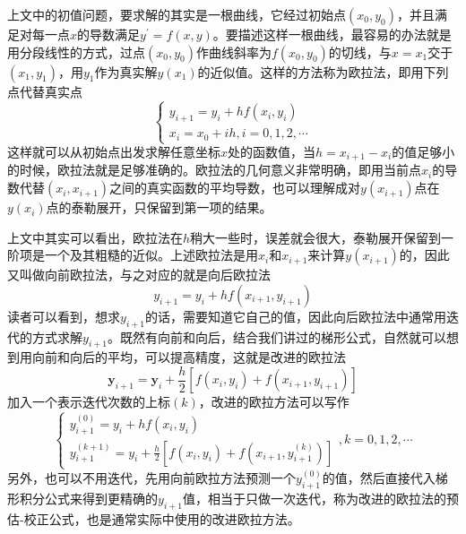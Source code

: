 \documentclass[12pt,a4paper,openany,twoside]{book}
\numberwithin{equation}{section}
\begin{document}
      上文中的初值问题，要求解的其实是一根曲线，它经过初始点$(x_0,y_0)$，并且满足对每一点$x$的导数满足$y^{\prime}=f(x, y)$。要描述这样一根曲线，最容易的办法就是用分段线性的方式，过点$(x_0,y_0)$作曲线斜率为$f(x_0,y_0)$的切线，与$x=x_1$交于$(x_1,y_1)$，用$y_1$作为真实解$y(x_1)$的近似值。这样的方法称为欧拉法，即用下列点代替真实点
      \begin{equation}
        \left\{\begin{array}{l}{y_{i+1}=y_{i}+h f\left(x_{i}, y_{i}\right)} \\ {x_{i}=x_{0}+i h, i=0,1,2, \cdots}\end{array}\right.
      \end{equation}
      这样就可以从初始点出发求解任意坐标$x$处的函数值，当$h = x_{i+1}-x_i$的值足够小的时候，欧拉法就是足够准确的。欧拉法的几何意义非常明确，即用当前点$x_i$的导数代替$(x_i,x_{i+1})$之间的真实函数的平均导数，也可以理解成对$y(x_{i+1})$点在$y(x_i)$点的泰勒展开，只保留到第一项的结果。

      上文中其实可以看出，欧拉法在$h$稍大一些时，误差就会很大，泰勒展开保留到一阶项是一个及其粗糙的近似。上述欧拉法是用$x_i$和$x_{i+1}$来计算$y(x_{i+1})$的，因此又叫做向前欧拉法，与之对应的就是向后欧拉法
      \begin{equation}
        y_{i+1}=y_{i}+h f\left(x_{i+1}, y_{i+1}\right)
      \end{equation}
      读者可以看到，想求$y_{i+1}$的话，需要知道它自己的值，因此向后欧拉法中通常用迭代的方式求解$y_{i+1}$。既然有向前和向后，结合我们讲过的梯形公式，自然就可以想到用向前和向后的平均，可以提高精度，这就是改进的欧拉法
      \begin{equation*}
        \boldsymbol{y}_{i+1}=\boldsymbol{y}_{i}+\frac{h}{2}\left[f\left(x_{i}, y_{i}\right)+f\left(x_{i+1}, y_{i+1}\right)\right]
      \end{equation*}
      加入一个表示迭代次数的上标$(k)$，改进的欧拉方法可以写作
      \begin{equation}
        \left\{\begin{array}{l}{y_{i+1}^{(0)}=y_{i}+h f\left(x_{i}, y_{i}\right)} \\ {y_{i+1}^{(k+1)}=y_{i}+\frac{h}{2}\left[f\left(x_{i}, y_{i}\right)+f\left(x_{i+1}, y_{i+1}^{(k)}\right)\right]}\end{array}\right., k=0,1,2, \cdots
      \end{equation}
      另外，也可以不用迭代，先用向前欧拉方法预测一个$y_{i+1}^{(0)}$的值，然后直接代入梯形积分公式来得到更精确的$y_{i+1}$值，相当于只做一次迭代，称为改进的欧拉法的预估-校正公式，也是通常实际中使用的改进欧拉方法。
\end{document}
